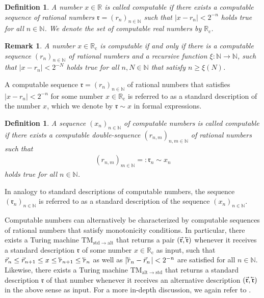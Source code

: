 \documentclass[conference]{IEEEtran}
\def\NN{{\mathbb N}}
\def\RR{{\mathbb R}}
\newcommand{\RRc}{\RR_{\mathrm{c}}}
\newcommand{\TM}{\mathrm{TM}}
\newcommand{\cev}[1]{\reflectbox{\ensuremath{\vec{\reflectbox{\ensuremath{#1}}}}}}
\newtheorem{Definition}[Theorem]{Definition}
\newtheorem{Remark}[Theorem]{Remark}
\begin{document}
	\begin{Definition}  \label{compreal}
						A number \(x\in\RR\) is called computable if there exists a computable sequence of rational numbers 
						\(\mathfrak{r} = (r_n)_{n\in\NN}\) such that \(|x-r_n|<2^{-n}\) holds true for all \(n\in\NN\). We denote the set of computable real numbers by \(\RRc\).
	\end{Definition}

	\begin{Remark}  A number \(x\in\RRc\) is computable if and only if there is a computable sequence \((r_n)_{n\in\NN}\) 
					of rational numbers and a recursive function \(\xi:\NN\to\NN\), such that \(|x-r_n|< 2^{-N}\)
					holds true for all \(n,N\in\NN\) that satisfy \(n \geq \xi(N)\). 
	\end{Remark}

	\noindent A computable sequence \(\mathfrak{r} = (r_n)_{n\in\NN}\) of rational numbers that satisfies \(|x-r_n|<2^{-n}\) for some number \(x\in\RRc\) 
	is referred to as a standard description of the number \(x\), which we denote by \(\mathfrak{r}\sim x\) in formal expressions. 
	
	\begin{Definition}	A sequence \((x_n)_{n\in\NN}\) of computable numbers is called computable if there exists a computable double-sequence
						\((r_{n,m})_{n,m\in\NN}\) of rational numbers such that 
						\begin{align} (r_{n,m})_{m\in\NN} =: \mathfrak{r}_n \sim x_n
						\end{align}
						holds true for all \(n\in\NN\).
	\end{Definition}
	
	In analogy to standard descriptions of computable numbers, the sequence \((\mathfrak{r}_n)_{n\in\NN}\) is referred to as a standard description
	of the sequence \((x_n)_{n\in\NN}\).

	Computable numbers can alternatively be characterized by computable sequences of rational numbers that satisfy monotonicity conditions. 
	In particular, there exists a Turing machine \(\TM_{\mathrm{std}\rightarrow\mathrm{alt}}\) that returns a pair \((\vec{\mathfrak{r}}, \cev{\mathfrak{r}})\) 
	whenever it receives a standard description \(\mathfrak{r}\) of some number \(x\in\RRc\) as input, such that
	\(	\vec{r}_n \leq \vec{r}_{n+1} \leq x \leq \cev{r}_{n+1} \leq \cev{r}_n
	\)
	as well as 
	\(	| \cev{r}_n - \vec{r}_n\hspace{1pt}| < 2^{-n}
	\)
	are satisfied for all \(n\in\NN\). Likewise, there exists a Turing machine \(\TM_{\mathrm{alt}\rightarrow\mathrm{std}}\) that returns a standard description 
	\(\mathfrak{r}\) of that number whenever it receives an alternative description \((\vec{\mathfrak{r}}, \cev{\mathfrak{r}})\) in the above sense as input. 
	For a more in-depth discussion, we again refer to \cite{PoRi17}. %
\end{document}
